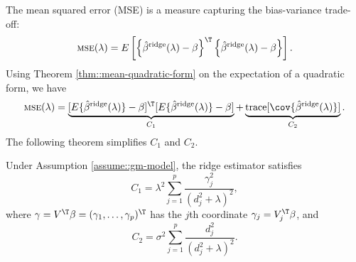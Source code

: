  
The mean squared error (MSE)
is a measure capturing the bias-variance trade-off:
\[
\textsc{mse}(\lambda)=E\left[\left\{ \hat{\beta}^{\text{ridge}}(\lambda)-\beta\right\} ^{\T}\left\{ \hat{\beta}^{\text{ridge}}(\lambda)-\beta\right\} \right].
\]
Using Theorem \ref{thm::mean-quadratic-form} on the expectation of a quadratic form, we have
\[
\textsc{mse}(\lambda)=\underbrace{    [ E\{  \hat{\beta}^{\text{ridge}}(\lambda)\}  - \beta  ]^{\T} [ E\{  \hat{\beta}^{\text{ridge}}(\lambda)\} - \beta  ]   }_{C_{1}}
+\underbrace{\text{trace}[ \cov\{  \hat{\beta}^{\text{ridge}}(\lambda)\} ]  }_{C_{2}}.
\]
The following theorem simplifies $C_{1}$ and $C_{2}.$ 

 

\begin{theorem}
\label{theorem:bias-variance-tradeoff-ridge} Under  Assumption \ref{assume::gm-model}, the ridge estimator satisfies   
\begin{equation}
C_{1}=\lambda^{2}\sum_{j=1}^{p}\frac{\gamma_{j}^{2}}{( d_j^2 +\lambda)^{2}},\label{eq:term1-ridge-mse}
\end{equation}
where $\gamma=V^{\T}\beta=(\gamma_{1},\ldots,\gamma_{p})^{\T}$ has the $j$th coordinate $\gamma_j = V_j^{\T} \beta$,
and 
\begin{equation}
C_{2}=\sigma^{2}\sum_{j=1}^{p}\frac{ d_j^2 }{( d_j^2 +\lambda)^{2}}.\label{eq:term2-ridge-mse}
\end{equation}
\end{theorem}



